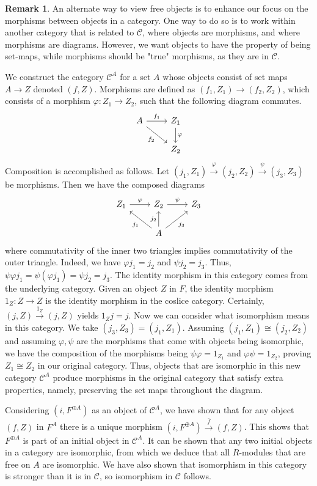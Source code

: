 \documentclass[12pt]{article}
\theoremstyle{definition}
\newtheorem{remark}{Remark}[section]
\theoremstyle{plain}
\numberwithin{equation}{section}
\theoremstyle{definition}
\begin{document}
\begin{remark}

An alternate way to view free objects is to enhance our focus on the morphisms between objects in a category. One way to do so is to work within another category that is related to $ \mathscr{C} $, where objects are morphisms, and where morphisms are diagrams. However, we want objects to have the property of being set-maps, while morphisms should be "true" morphisms, as they are in $ \mathscr{C} $.

We construct the category $ \mathscr{C}^A $ for a set $ A $ whose objects consist of set maps $ A \to Z$ denoted $ (f, Z) $. Morphisms are defined as $  (f_1, Z_1) \to (f_2, Z_2) $, which consists of a morphism $ \varphi : Z_1 \to Z_2 $, such that the following diagram commutes.
\[ \begin{tikzcd}
		A \arrow[dr, "f_2"'] \arrow[r, "f_1"] & Z_1 \arrow[d, "\varphi"]\\
											 & Z_2 
\end{tikzcd}\]
Composition is accomplished as follows. Let $ (j_1, Z_1) \xrightarrow{\varphi} (j_2, Z_2) \xrightarrow{\psi} (j_3, Z_3)$ be morphisms. Then we have the composed diagrams
\[ \begin{tikzcd}
	Z_1 \arrow[r, "\varphi"] & Z_2 \arrow[r, "\psi"] & Z_3\\
		& A \arrow[ul, "j_1"] \arrow[u, "j_2"] \arrow[ur, "j_3"'] &
\end{tikzcd}\]
where commutativity of the inner two triangles implies commutativity of the outer triangle. Indeed, we have $ \varphi j_1 = j_2 $ and $ \psi j_2 = j_3 $. Thus, $ \psi \varphi j_1 = \psi (\varphi j_1) = \psi j_2 = j_3 $. The identity morphism in this category comes from the underlying category. Given an object $ Z $ in $ F $, the identity morphism $ 1_Z : Z \to Z $ is the identity morphism in the coslice category. Certainly, $ (j, Z) \xrightarrow{1_Z} (j, Z)$ yields $ 1_Z j = j $. Now we can consider what isomorphism means in this category. We take $ (j_3, Z_3) = (j_1, Z_1) $. Assuming $ (j_1, Z_1) \cong (j_2, Z_2) $ and assuming $ \varphi, \psi $ are the morphisms that come with objects being isomorphic, we have the composition of the morphisms being $ \psi \varphi = 1_{Z_1} $ and $ \varphi \psi = 1_{Z_2} $, proving $ Z_1 \cong Z_2 $ in our original category. Thus, objects that are isomorphic in this new category $ \mathscr{C}^A $ produce morphisms in the original category that satisfy extra properties, namely, preserving the set maps throughout the diagram.

Considering $ (i, F^{\oplus A}) $ as an object of $ \mathscr{C}^A $, we have shown that for any object $ (f, Z) $ in $ F^A $ there is a unique morphism $ (i, F^{\oplus A}) \xrightarrow{\bar{f}} (f, Z) $. This shows that $ F^{\oplus A} $ is part of an initial object in $ \mathscr{C}^A $. It can be shown that any two initial objects in a category are isomorphic, from which we deduce that all $ R $-modules that are free on $ A $ are isomorphic. We have also shown that isomorphism in this category is stronger than it is in $ \mathscr{C} $, so isomorphism in $ \mathscr{C} $ follows.
\end{remark}
\end{document}
